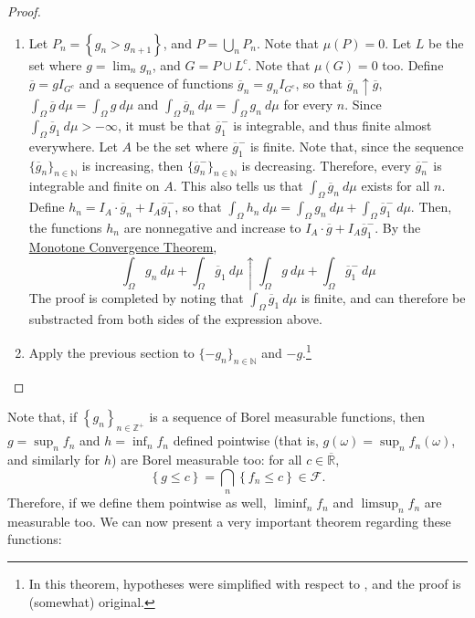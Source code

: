 \begin{proof}
	\begin{enumerate}
			\item Let \(P_{n}=\left\{g_{n}>g_{n+1}\right\}\), and
\(P=\bigcup_{n}P_{n}\). Note that \(\mu(P)=0\). Let \(L\) be the set where
\(g=\lim_{n}g_{n}\), and \(G=P\cup L^c\). Note that \(\mu(G)=0\) too. Define \(\overline g=gI_{G^c}\) and a sequence of functions \(\overline g_{n}=g_{n}I_{G^c}\), so that
\(\overline g_{n}\uparrow \overline g\),
\(\int_{\Omega}\overline g~d\mu=\int_{\Omega}g~d\mu\) and
\(\int_{\Omega}\overline{g}_{n}~d\mu=\int_{\Omega}g_{n}~d\mu\) for every \(n\).
Since \(\int_{\Omega}\overline g_{1}~d\mu>-\infty\), it must be that
\(\overline g_{1}^-\) is integrable, and thus finite almost everywhere. Let
\(A\) be the set where \(\overline g_{1}^-\) is finite. Note that, since the
sequence \(\{\overline g_{n}\}_{n\in\mathbb{N}}\) is increasing, then
\(\{\overline g_{n}^-\}_{n\in\mathbb{N}}\) is decreasing. Therefore, every
\(\overline g_{n}^-\) is integrable and finite on \(A\). This also tells us that
\(\int_{\Omega}\overline g_{n}~d\mu\) exists for all \(n\). Define
\(h_{n}=I_{A}\cdot\overline g_{n}+I_{A}\overline g_{1}^-\), so that
\(\int_{\Omega}h_{n}~d\mu=\int_{\Omega} g_{n}~d\mu+\int_{\Omega}\overline g_{1}^-~d\mu\).
Then, the functions \(h_{n}\) are nonnegative and increase to
\(I_{A}\cdot\overline g+I_{A}\overline g_{1}^-\). By the \hyperref[theorem:Monotone
Convergence]{Monotone Convergence Theorem},
		\[ \int_{\Omega}g_{n}~d\mu+\int_{\Omega}\overline g_{1}~d\mu\uparrow \int_{\Omega} 	g~d\mu+\int_{\Omega}\overline g_{1}^-~d\mu
		\] The proof is completed by noting that
\(\int_{\Omega}\overline g_{1}~d\mu\) is finite, and can therefore be substracted
from both sides of the expression above.
		\item Apply the previous section to \(\{-g_{n}\}_{n\in\mathbb{N}}\) and
				\(-g\).\footnote{In this theorem, hypotheses were simplified with respect to \cite{ash1972real}, and the proof is (somewhat) original.}
	\end{enumerate}
\end{proof}
Note that, if \(\left\{g_n\right\}_{n\in\mathbb{Z}^+}\) is a sequence of Borel
measurable functions, then \(g=\sup_nf_n\) and \(h=\inf_nf_n\) defined pointwise
(that is, \(g(\omega)=\sup_nf_n(\omega)\), and similarly for \(h\)) are Borel
measurable too: for all \(c\in\overline{\mathbb{R}}\),
\[
\left\{g\leq c\right\}=\bigcap_n\left\{f_n\leq c\right\}\in\mathcal{F}
.\]
Therefore, if we define them pointwise as well, \(\liminf_nf_n\) and
\(\limsup_nf_n\) are measurable too. We can now present a very important theorem
regarding these functions:

